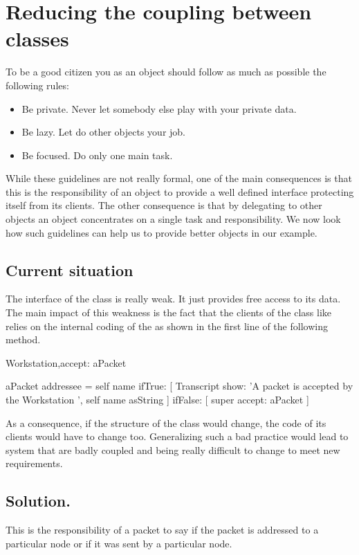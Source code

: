 \section{Reducing the coupling between classes}
To be a good citizen you as an object should follow as much as 
possible the following rules:

\begin{itemize}
\item
Be private. Never let somebody else play with your private data.
\item
Be lazy. Let do other objects your job.
\item
Be focused. Do only one main task. 
\end{itemize}

While these guidelines are not really formal, one of the main consequences is that this is the responsibility of an object to provide a well defined interface protecting itself from its clients. The other consequence is that by delegating to other  objects an object concentrates on a single task and responsibility. We now look how such guidelines can help us to provide better objects in our example.



\subsection{Current situation}
The interface of the  class is really weak. It just provides free access to its data. The main impact of this weakness is the fact that the clients of the class  like  relies on the internal coding of the  as shown in the first line of the following method.

\begin{scode}
Workstation\sep{}accept: aPacket

    aPacket addressee = self name
       ifTrue: [  Transcript show: 'A packet is accepted by the Workstation ', self name asString ] 
       ifFalse:  [ super accept: aPacket ] 
\end{scode}

As a consequence, if the structure of the class  would  change, the code of its clients would have to change too. Generalizing  such a bad practice would lead to system that are badly coupled and being really difficult to change to meet new requirements.



\subsection{Solution.}
This is the responsibility of a packet to say if the packet is addressed to a particular node or if it was sent by a particular node.

